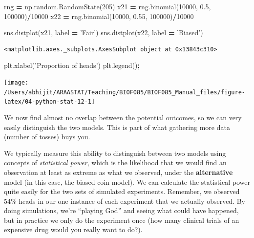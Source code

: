 \documentclass[
  letterpaper,
]{scrbook}
\newenvironment{Shaded}{\begin{snugshade}}{\end{snugshade}}
\newcommand{\DecValTok}[1]{\textcolor[rgb]{0.00,0.00,0.81}{#1}}
\newcommand{\FloatTok}[1]{\textcolor[rgb]{0.00,0.00,0.81}{#1}}
\newcommand{\NormalTok}[1]{#1}
\newcommand{\OperatorTok}[1]{\textcolor[rgb]{0.81,0.36,0.00}{\textbf{#1}}}
\newcommand{\StringTok}[1]{\textcolor[rgb]{0.31,0.60,0.02}{#1}}
\begin{document}
\begin{Shaded}
\begin{Highlighting}[]
\NormalTok{rng }\OperatorTok{=}\NormalTok{ np.random.RandomState(}\DecValTok{205}\NormalTok{)}
\NormalTok{x21 }\OperatorTok{=}\NormalTok{ rng.binomial(}\DecValTok{10000}\NormalTok{, }\FloatTok{0.5}\NormalTok{, }\DecValTok{100000}\NormalTok{)}\OperatorTok{/}\DecValTok{10000}
\NormalTok{x22 }\OperatorTok{=}\NormalTok{ rng.binomial(}\DecValTok{10000}\NormalTok{, }\FloatTok{0.55}\NormalTok{, }\DecValTok{100000}\NormalTok{)}\OperatorTok{/}\DecValTok{10000}

\NormalTok{sns.distplot(x21, label }\OperatorTok{=} \StringTok{'Fair'}\NormalTok{)}
\NormalTok{sns.distplot(x22, label }\OperatorTok{=} \StringTok{'Biased'}\NormalTok{)}
\end{Highlighting}
\end{Shaded}

\begin{verbatim}
<matplotlib.axes._subplots.AxesSubplot object at 0x13843c310>
\end{verbatim}

\begin{Shaded}
\begin{Highlighting}[]
\NormalTok{plt.xlabel(}\StringTok{'Proportion of heads'}\NormalTok{)}
\NormalTok{plt.legend()}\OperatorTok{;}
\end{Highlighting}
\end{Shaded}

\begin{center}\texttt{[image: /Users/abhijit/ARAASTAT/Teaching/BIOF085/BIOF085\_Manual\_files/figure-latex/04-python-stat-12-1]} \end{center}

We now find almost no overlap between the potential outcomes, so we can very easily distinguish the two models. This is part of what gathering more data (number of tosses) buys you.

We typically measure this ability to distinguish between two models using concepts of \emph{statistical power}, which is the likelihood that we would find an observation at least as extreme as what we observed, under the \textbf{alternative} model (in this case, the biased coin model). We can calculate the statistical power quite easily for the two sets of simulated experiments. Remember, we observed 54\% heads in our one instance of each experiment that we actually observed. By doing simulations, we're ``playing God'' and seeing what could have happened, but in practice we only do the experiment once (how many clinical trials of an expensive drug would you really want to do?).
\end{document}
